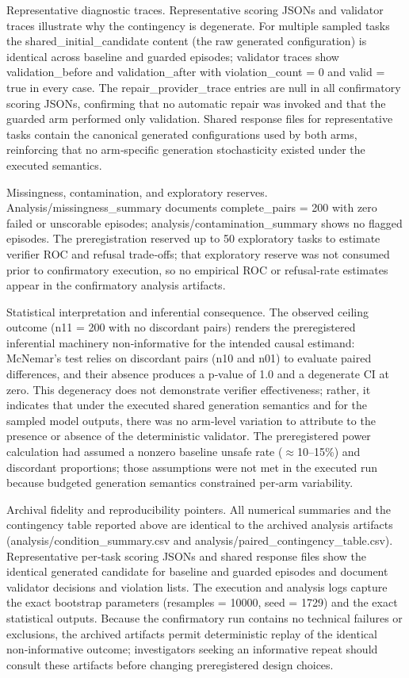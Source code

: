 \documentclass[conference]{IEEEtran}
\begin{document}
Representative diagnostic traces. Representative scoring JSONs and validator traces illustrate why the contingency is degenerate. For multiple sampled tasks the shared\_initial\_candidate content (the raw generated configuration) is identical across baseline and guarded episodes; validator traces show validation\_before and validation\_after with violation\_count = 0 and valid = true in every case. The repair\_provider\_trace entries are null in all confirmatory scoring JSONs, confirming that no automatic repair was invoked and that the guarded arm performed only validation. Shared response files for representative tasks contain the canonical generated configurations used by both arms, reinforcing that no arm‑specific generation stochasticity existed under the executed semantics.

Missingness, contamination, and exploratory reserves. Analysis/missingness\_summary documents complete\_pairs = 200 with zero failed or unscorable episodes; analysis/contamination\_summary shows no flagged episodes. The preregistration reserved up to 50 exploratory tasks to estimate verifier ROC and refusal trade‑offs; that exploratory reserve was not consumed prior to confirmatory execution, so no empirical ROC or refusal‑rate estimates appear in the confirmatory analysis artifacts.

Statistical interpretation and inferential consequence. The observed ceiling outcome (n11 = 200 with no discordant pairs) renders the preregistered inferential machinery non‑informative for the intended causal estimand: McNemar's test relies on discordant pairs (n10 and n01) to evaluate paired differences, and their absence produces a p‑value of 1.0 and a degenerate CI at zero. This degeneracy does not demonstrate verifier effectiveness; rather, it indicates that under the executed shared generation semantics and for the sampled model outputs, there was no arm‑level variation to attribute to the presence or absence of the deterministic validator. The preregistered power calculation had assumed a nonzero baseline unsafe rate (\ensuremath{\approx}10--15\%) and discordant proportions; those assumptions were not met in the executed run because budgeted generation semantics constrained per‑arm variability.

Archival fidelity and reproducibility pointers. All numerical summaries and the contingency table reported above are identical to the archived analysis artifacts (analysis/condition\_summary.csv and analysis/paired\_contingency\_table.csv). Representative per‑task scoring JSONs and shared response files show the identical generated candidate for baseline and guarded episodes and document validator decisions and violation lists. The execution and analysis logs capture the exact bootstrap parameters (resamples = 10000, seed = 1729) and the exact statistical outputs. Because the confirmatory run contains no technical failures or exclusions, the archived artifacts permit deterministic replay of the identical non‑informative outcome; investigators seeking an informative repeat should consult these artifacts before changing preregistered design choices.
\end{document}
